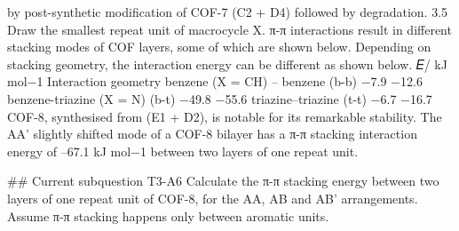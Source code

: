 by post-synthetic modification of COF-7 (C2 + D4) followed by degradation. 3.5 Draw the smallest repeat unit of macrocycle X. π-π interactions result in different stacking modes of COF layers, some of which are shown below. Depending on stacking geometry, the interaction energy can be different as shown below. 𝐸/ kJ mol−1 Interaction geometry benzene (X = CH) – benzene (b-b) −7.9 −12.6 benzene-triazine (X = N) (b-t) −49.8 −55.6 triazine–triazine (t-t) −6.7 −16.7 COF-8, synthesised from (E1 + D2), is notable for its remarkable stability. The AA' slightly shifted mode of a COF-8 bilayer has a π-π stacking interaction energy of –67.1 kJ mol−1 between two layers of one repeat unit.

\#\# Current subquestion T3-A6
Calculate the π-π stacking energy between two layers of one repeat unit of COF-8, for the AA, AB and AB' arrangements. Assume π-π stacking happens only between aromatic units.

